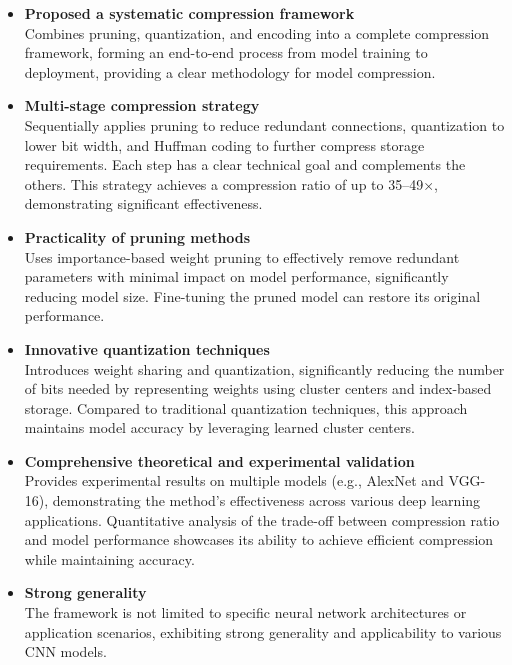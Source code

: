 \documentclass[12pt]{article}
\begin{document}
\begin{itemize}
    \item \textbf{Proposed a systematic compression framework}\\
    Combines pruning, quantization, and encoding into a complete compression framework, forming an end-to-end process from model training to deployment, providing a clear methodology for model compression.

    \item \textbf{Multi-stage compression strategy}\\
    Sequentially applies pruning to reduce redundant connections, quantization to lower bit width, and Huffman coding to further compress storage requirements. Each step has a clear technical goal and complements the others.
    This strategy achieves a compression ratio of up to 35–49×, demonstrating significant effectiveness.

    \item \textbf{Practicality of pruning methods}\\
    Uses importance-based weight pruning to effectively remove redundant parameters with minimal impact on model performance, significantly reducing model size.
    Fine-tuning the pruned model can restore its original performance.

    \item \textbf{Innovative quantization techniques}\\
    Introduces weight sharing and quantization, significantly reducing the number of bits needed by representing weights using cluster centers and index-based storage.
    Compared to traditional quantization techniques, this approach maintains model accuracy by leveraging learned cluster centers.

    \item \textbf{Comprehensive theoretical and experimental validation}\\
    Provides experimental results on multiple models (e.g., AlexNet and VGG-16), demonstrating the method's effectiveness across various deep learning applications.
    Quantitative analysis of the trade-off between compression ratio and model performance showcases its ability to achieve efficient compression while maintaining accuracy.

    \item \textbf{Strong generality}\\
    The framework is not limited to specific neural network architectures or application scenarios, exhibiting strong generality and applicability to various CNN models.


\end{itemize}
\end{document}
